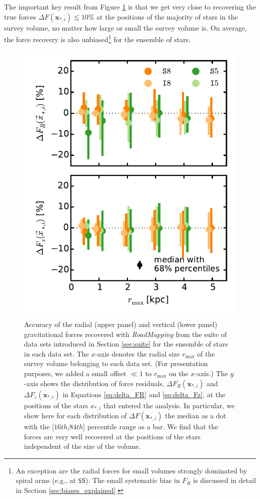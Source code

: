 \documentclass[iop,revtex4,numberedappendix,appendixfloats]{emulateapj}
\newcommand{\vect}[1]{\boldsymbol{#1}}
\newcommand{\RM}{{\sl RoadMapping}}
\begin{document}
The important key result from Figure \ref{fig:forces_bias_a} is that we get very close to recovering the true forces $\Delta F(\vect{x}_{*,i}) \lesssim 10\%$ at the positions of the majority of stars in the survey volume, no matter how large or small the survey volume is. On average, the force recovery is also unbiased\footnote{An exception are the radial forces for small volumes strongly dominated by spiral arms (e.g., at \texttt{S5}). The small systematic bias in $F_R$ is discussed in detail in Section \ref{sec:biases_explained}.} for the ensemble of stars.

\begin{figure}[!htbp]
\centering
  \includegraphics[width=\columnwidth]{fig/MNdHHdiffSph2_bias_in_forces_recovery_3_a.pdf}
  \caption{Accuracy of the radial (upper panel) and vertical (lower panel) gravitational forces recovered with \RM{} from the suite of data sets introduced in Section \ref{sec:suite} for the ensemble of stars in each data set. The $x$-axis denotes the radial size $r_\text{max}$ of the survey volume belonging to each data set. (For presentation purposes, we added a small offset $\ll 1$ to $r_\text{max}$ on the $x$-axis.) The $y$-axis shows the distribution of force residuals, $\Delta F_{R}(\vect{x}_{*,i})$ and $\Delta F_{z}(\vect{x}_{*,i})$ in Equations \eqref{eq:delta_FR} and \eqref{eq:delta_Fz}, at the positions of the stars $x_{*,i}$ that entered the analysis. In particular, we show here for each distribution of $\Delta F(\vect{x}_{*,i})$ the median as a dot with the [$16th$,$84th$] percentile range as a bar. We find that the forces are very well recovered at the positions of the stars independent of the size of the volume.}
\label{fig:forces_bias_a}
\end{figure}
\end{document}
